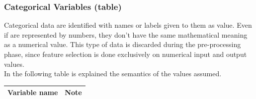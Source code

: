 \subsubsection{Categorical Variables (table)}
Categorical data are identified with names or labels given to them as value. Even if are represented by numbers, they don't have the same mathematical meaning as a numerical value. 
This type of data is discarded during the pre-processing phase, since feature selection is done exclusively on numerical input and output values. \\
In the following table is explained the semantics of the values assumed.
\bigbreak
\begin{center} 
\setlength{\arrayrulewidth}{1.5pt}
\begin{longtable}{ |p{2.5cm}|p{10cm}| } 
\hline
\textbf{Variable name} & \textbf{Note}\\ 
\hline


\end{longtable}
\end{center}
